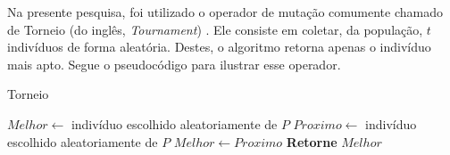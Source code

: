 Na presente pesquisa, foi utilizado o operador de mutação comumente chamado de 
Torneio (do inglês, \textit{Tournament}) \citep{Luke2013Metaheuristics}. Ele 
consiste em coletar, da população, $t$ indivíduos de forma aleatória. Destes, 
o algoritmo retorna apenas o indivíduo mais apto. Segue o pseudocódigo para 
ilustrar esse operador.

\begin{algorithm}                      %
	\caption{Torneio}          %
	\label{torneio}                           %
	\begin{algorithmic}                    %
		\State $Melhor \gets $ indivíduo escolhido aleatoriamente de $P$ 
			\State $Proximo \gets $ indivíduo escolhido aleatoriamente de $P$
				\State $Melhor \gets Proximo$
			\EndIf
		\EndFor
		\State \textbf{Retorne} $Melhor$
		\EndProcedure
	\end{algorithmic}
\end{algorithm}